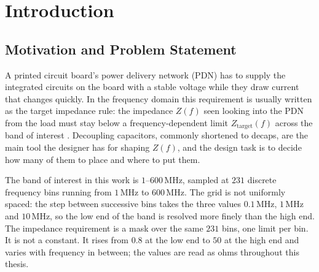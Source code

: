 
\chapter{Introduction}
\label{ch:introduction}

\section{Motivation and Problem Statement}
\label{sec:motivation_problem}

A printed circuit board's power delivery network (PDN) has to supply the integrated circuits on
the board with a stable voltage while they draw current that changes quickly. In the frequency
domain this requirement is usually written as the target impedance rule: the impedance $Z(f)$ seen
looking into the PDN from the load must stay below a frequency-dependent limit
$Z_{\mathrm{target}}(f)$ across the band of interest \cite{smith1999target}. Decoupling capacitors,
commonly shortened to decaps, are the main tool the designer has for shaping $Z(f)$, and the design
task is to decide how many of them to place and where to put them.

The band of interest in this work is $1$--$600$\,MHz, sampled at $231$ discrete frequency bins
running from $1$\,MHz to $600$\,MHz. The grid is not uniformly spaced: the step between successive
bins takes the three values $0.1$\,MHz, $1$\,MHz and $10$\,MHz, so the low end of the band is
resolved more finely than the high end. The impedance requirement is a mask over the same $231$
bins, one limit per bin. It is not a constant. It rises from $0.8$ at the low end to $50$ at the
high end and varies with frequency in between; the values are read as ohms throughout this thesis.

